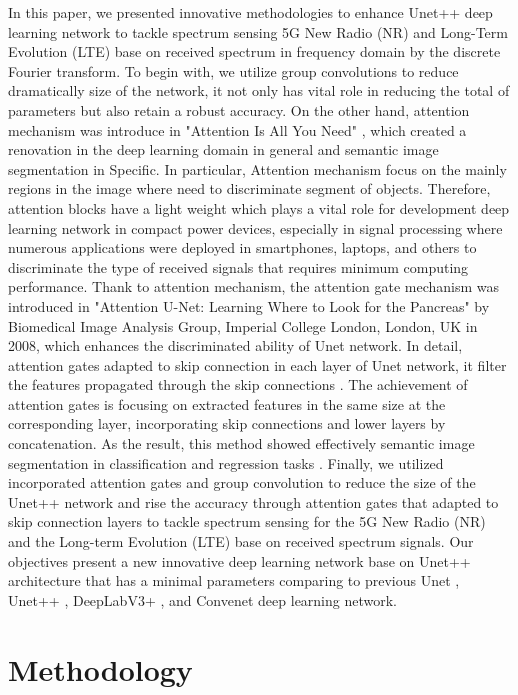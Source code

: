 \documentclass[journal]{IEEEtran} %
\begin{document}
In this paper, we presented innovative methodologies to enhance Unet++ deep learning network to tackle spectrum sensing 5G New Radio (NR) and Long-Term Evolution (LTE) base on received spectrum in frequency domain by the discrete Fourier transform. To begin with, we utilize group convolutions \cite{b9} to reduce dramatically size of the network, it not only has vital role in reducing the total of parameters but also retain a robust accuracy. On the other hand, attention mechanism was introduce in "Attention Is All You Need" \cite{b4}, which created a renovation in the deep learning domain in general and semantic image segmentation in Specific. In particular, Attention mechanism focus on the mainly regions in the image where need to discriminate segment of objects. Therefore, attention blocks have a light weight which plays a vital role for development deep learning network in compact power devices, especially in signal processing where numerous applications were deployed in smartphones, laptops, and others to discriminate the type of received signals that requires minimum computing performance. Thank to attention mechanism, the attention gate mechanism was introduced in "Attention U-Net: Learning Where to Look for the Pancreas" \cite{b3} by Biomedical Image Analysis Group, Imperial College London, London, UK in 2008, which enhances the discriminated ability of Unet network. In detail, attention gates adapted to skip connection in each layer of Unet network, it filter the features propagated through the skip connections \cite{b3}. The achievement of attention gates is focusing on extracted features in the same size at the corresponding layer, incorporating skip connections and lower layers by concatenation. As the result, this method showed effectively semantic image segmentation in classification and regression tasks \cite{b3}. Finally, we utilized incorporated attention gates and group convolution to reduce the size of the Unet++ network and rise the accuracy through attention gates that adapted to skip connection layers to tackle spectrum sensing for the 5G New Radio (NR) and the Long-term Evolution (LTE) base on received spectrum signals. Our objectives present a new innovative deep learning network base on Unet++ architecture that has a minimal parameters comparing to previous Unet \cite{b5}, Unet++ \cite{b6}, DeepLabV3+ \cite{b2}, and Convenet \cite{b1} deep learning network.


\section{Methodology}
\end{document}
